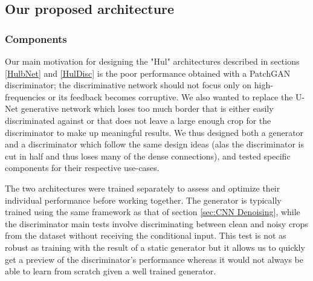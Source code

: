 \subsection{Our proposed architecture}
\subsubsection{Components}\label{sec:Components}
Our main motivation for designing the "Hul" architectures described in sections \ref{HulbNet} and \ref{HulDisc} is the poor performance obtained with a PatchGAN discriminator; the discriminative network should not focus only on high-frequencies or its feedback becomes corruptive. We also wanted to replace the U-Net generative network which loses too much border that is either easily discriminated against or that does not leave a large enough crop for the discriminator to make up meaningful results. We thus designed both a generator and a discriminator which follow the same design ideas (alas the discriminator is cut in half and thus loses many of the dense connections), and tested specific components for their respective use-cases.


The two architectures were trained separately to assess and optimize their individual performance before working together. The generator is typically trained using the same framework as that of section \ref{sec:CNN Denoising}, while the discriminator main tests involve discriminating between clean and noisy crops from the dataset without receiving the conditional input. This test is not as robust as training with the result of a static generator but it allows us to quickly get a preview of the discriminator's performance whereas it would not always be able to learn from scratch given a well trained generator.

